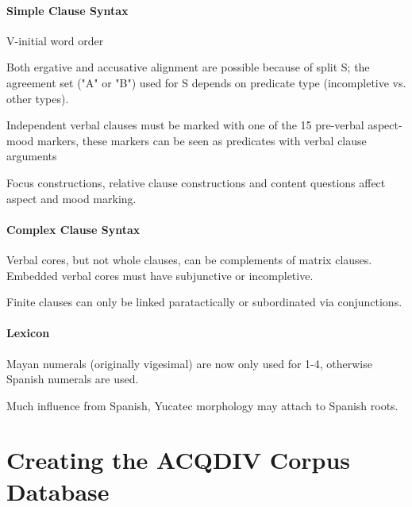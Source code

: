\documentclass[a4paper, 11pt]{book}
\begin{document}
\subsubsection*{Simple Clause Syntax}
\begin{itemize*}
\item  V-initial word order
\item  Both ergative and accusative alignment are possible because of split S; the agreement set ("A" or "B") used for S depends on predicate type (incompletive vs. other types). 
\item  Independent verbal clauses must be marked with one of the 15 pre-verbal aspect-mood markers, these markers can be seen as predicates with verbal clause arguments
\item  Focus constructions, relative clause constructions and content questions affect aspect and mood marking.
\end{itemize*}

\subsubsection*{Complex Clause Syntax}
\begin{itemize*}
\item  Verbal cores, but not whole clauses, can be complements of matrix clauses. Embedded verbal cores must have subjunctive or incompletive.
\item  Finite clauses can only be linked paratactically or subordinated via conjunctions.
\end{itemize*}

\subsubsection*{Lexicon}
\begin{itemize*}
\item  Mayan numerals (originally vigesimal) are now only used for 1-4, otherwise Spanish numerals are used.
\item  Much influence from Spanish, Yucatec morphology may attach to Spanish roots.
\end{itemize*}




\chapter{Creating the ACQDIV Corpus Database}
\label{cha:Generating the corpus}
\end{document}
